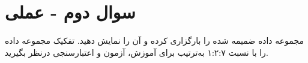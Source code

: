 \section{سوال دوم - عملی}
مجموعه داده ضمیمه شده را بارگزاری کرده و آن را نمایش دهید. تفکیک مجموعه داده را با نسبت ۱:۲:۷ به‌ترتیب برای آموزش، آزمون و اعتبارسنجی درنظر بگیرید.






































%
%
%
%
%
%
%
%
%
%
%
%
